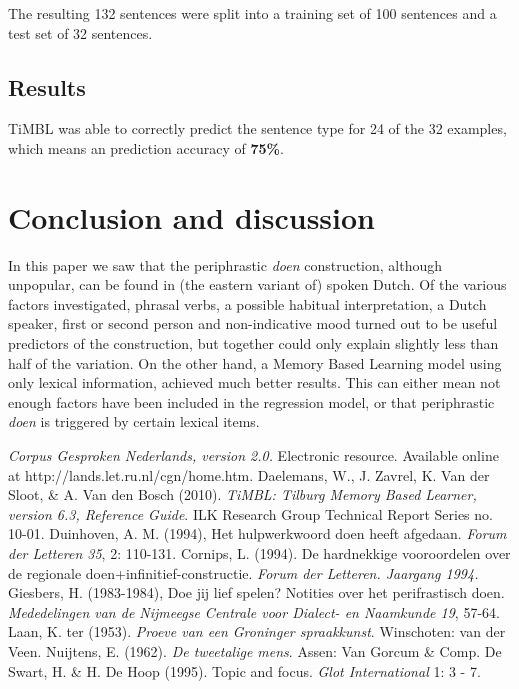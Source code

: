 \documentclass[12pt]{article}
\begin{document}
The resulting 132 sentences were split into a training set of 100 sentences and a test set of 32 sentences.

\subsection{Results}

TiMBL was able to correctly predict the sentence type for 24 of the 32 examples, which means an prediction accuracy of \textbf{75\%}.






\section{Conclusion and discussion} \label{conc}
In this paper we saw that the periphrastic \emph{doen} construction, although unpopular, can be found in (the eastern variant of) spoken Dutch. Of the various factors investigated, phrasal verbs, a possible habitual interpretation, a Dutch speaker, first or second person and non-indicative mood turned out to be useful predictors of the construction, but together could only explain slightly less than half of the variation. On the other hand, a Memory Based Learning model using only lexical information, achieved much better results. This can either mean not enough factors have been included in the regression model, or that periphrastic \emph{doen} is triggered by certain lexical items.

\begin{thebibliography}{99}\footnotesize
{}
\emph{Corpus Gesproken Nederlands, version 2.0.} Electronic resource. Available online at http://lands.let.ru.nl/cgn/home.htm.
Daelemans, W., J. Zavrel, K. Van der Sloot, \& A. Van den Bosch (2010). \emph{TiMBL: Tilburg Memory Based Learner, version 6.3, Reference Guide}. ILK Research Group Technical Report Series no. 10-01.
Duinhoven, A. M. (1994), Het hulpwerkwoord doen heeft afgedaan. \emph{Forum der Letteren 35}, 2: 110-131.
Cornips, L. (1994). De hardnekkige vooroordelen over de regionale doen+infinitief-constructie. \emph{Forum der Letteren. Jaargang 1994.}
Giesbers, H. (1983-1984), Doe jij lief spelen? Notities over het perifrastisch doen. \emph{Mededelingen van de Nijmeegse Centrale voor Dialect- en Naamkunde 19}, 57-64.
Laan, K. ter (1953). \emph{Proeve van een Groninger spraakkunst}. Winschoten: van der Veen.
Nuijtens, E. (1962). \emph{De tweetalige mens}. Assen: Van Gorcum \& Comp.
De Swart, H. \& H. De Hoop (1995). Topic and focus. \emph{Glot International} 1: 3 - 7.
\end{thebibliography}
\end{document}
